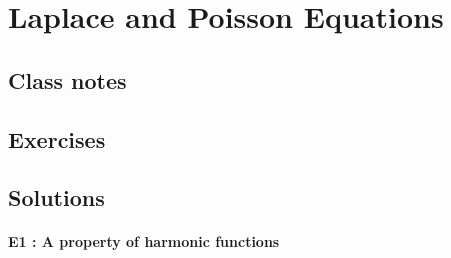 \chapter{Laplace and Poisson Equations}
\section{Class notes} 

\section{Exercises}

\section{Solutions}
\subsubsection{E1 : A property of harmonic functions}
